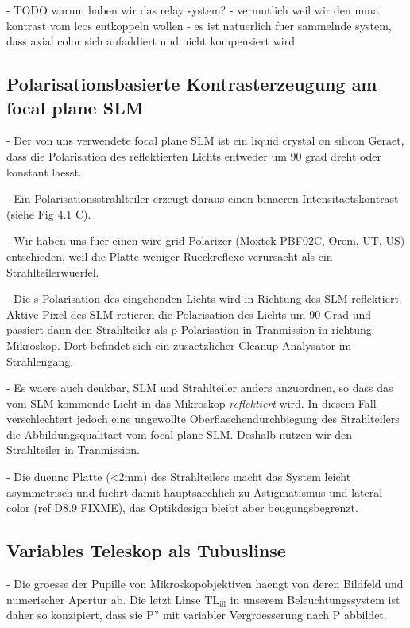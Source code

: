    - TODO warum haben wir das relay system? 
     - vermutlich weil wir den mma kontrast vom lcos entkoppeln wollen
     - es ist natuerlich fuer sammelnde system, dass axial color sich
       aufaddiert und nicht kompensiert wird


\subsection{ Polarisationsbasierte Kontrasterzeugung am focal plane SLM}
  - Der von uns verwendete focal plane SLM ist ein liquid crystal on
    silicon Geraet, dass die Polarisation des reflektierten Lichts
    entweder um 90 grad dreht oder konstant laesst.
 
  - Ein Polarisationsstrahlteiler erzeugt daraus einen binaeren
    Intensitaetskontrast (siehe Fig 4.1 C).

  - Wir haben uns fuer einen wire-grid Polarizer (Moxtek PBF02C, Orem,
    UT, US) entschieden, weil die Platte weniger Rueckreflexe
    verursacht als ein Strahlteilerwuerfel.

  - Die s-Polarisation des eingehenden Lichts wird in Richtung des SLM
    reflektiert. Aktive Pixel des SLM rotieren die Polarisation des
    Lichts um 90 Grad und passiert dann den Strahlteiler als
    p-Polarisation in Tranmission in richtung Mikroskop. Dort befindet
    sich ein zusaetzlicher Cleanup-Analysator im Strahlengang.
 
  - Es waere auch denkbar, SLM und Strahlteiler anders anzuordnen, so
    dass das vom SLM kommende Licht in das Mikroskop
    \emph{reflektiert} wird. In diesem Fall verschlechtert jedoch eine
    ungewollte Oberflaechendurchbiegung des Strahlteilers die
    Abbildungsqualitaet vom focal plane SLM. Deshalb nutzen wir den
    Strahlteiler in Tranmission.

  - Die duenne Platte (<2mm) des Strahlteilers macht das System leicht
    asymmetrisch und fuehrt damit hauptsaechlich zu Astigmatismus und
    lateral color (ref D8.9 FIXME), das Optikdesign bleibt aber
    beugungsbegrenzt.





\subsection{ Variables Teleskop als Tubuslinse}
  - Die groesse der Pupille von Mikroskopobjektiven haengt von deren
    Bildfeld und numerischer Apertur ab. Die letzt Linse
    TL${}_\textrm{ill}$ in unserem Beleuchtungssystem ist daher so
    konzipiert, dass sie P'' mit variabler Vergroesserung nach P
    abbildet. 

